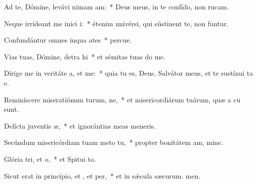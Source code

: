 \item Ad te, Dómine, levávi nimam am:~* Deus meus, in te confído, non rucam.
\item Neque irrídeant me inici i:~* étenim univérsi, qui sústinent te, non funtur.
\item Confundántur omnes inqua ates~* percue.
\item Vias tuas, Dómine, detra hi~* et sémitas tuas do me.
\item Dírige me in veritáte a, et  me:~* quia tu es, Deus, Salvátor meus, et te sustínui ta e.
\item Reminíscere miseratiónum turum, ne,~* et misericordiárum tuárum, quæ a cu sunt.
\item Delícta juventis æ,~* et ignorántias meas  meneris.
\item Secúndum misericórdiam tuam meto  tu,~* propter bonitátem am, mine.
\item Glória tri, et o,~* et Spitui to.
\item Sicut erat in princípio, et , et per,~* et in sǽcula sæcurum. men.
